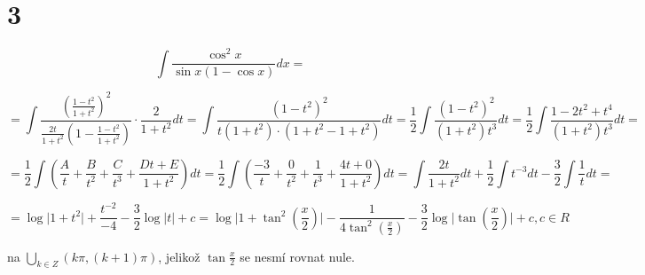 \documentclass[11pt,a4paper]{article}
\begin{document}
\section*{3}
$$
\int \frac{\cos^2 x}{\sin x (1 - \cos x)} dx = 
$$
\begin{flushright}
[substituce: $t = \tan \frac{x}{2}$, $dx = \frac{2}{1+t^2} dt$, $\sin x = \frac{2t}{1+t^2}$, $\cos x = \frac{1-t^2}{1+t^2}$]
\end{flushright}
$$
= \int \frac{ (\frac{1-t^2}{1+t^2})^2 }{ \frac{2t}{1+t^2} (1-\frac{1-t^2}{1+t^2})}
\cdot \frac{2}{1+t^2} dt
= \int \frac{ (1-t^2)^2}{ t(1+t^2)\cdot(1+t^2-1+t^2) } dt 
= \frac{1}{2} \int \frac{ (1-t^2)^2}{ (1+t^2) t^3 } dt 
= \frac{1}{2} \int \frac{ 1-2t^2+t^4 }{ (1+t^2) t^3 } dt =
$$  

$$
=\frac{1}{2} \int( \frac{A}{t} + \frac{B}{t^2} + \frac{C}{t^3} + \frac{Dt+E}{1+t^2} ) dt 
=\frac{1}{2} \int( \frac{-3}{t} + \frac{0}{t^2} + \frac{1}{t^3} + \frac{4t+0}{1+t^2} ) dt
=\int \frac{2t}{1+t^2} dt + \frac{1}{2} \int t^{-3} dt - \frac{3}{2} \int \frac{1}{t} dt = 
$$
\begin{flushright}
[první integrál substitucí za $s = 1+t^2$, druhé dva přímo]
\end{flushright}
$$
= \log \vert1+t^2\vert + \frac{t^{-2}}{-4} - \frac{3}{2} \log \vert t \vert + c
= \log \vert 1+\tan^2(\frac{x}{2}) \vert - \frac{1}{4 \tan^2(\frac{x}{2})} - \frac{3}{2} \log \vert \tan(\frac{x}{2}) \vert + c, c \in R
$$
\begin{flushright}
na $\bigcup_{k \in Z} (k\pi, (k+1)\pi)$, jelikož $\tan \frac{x}{2}$ se nesmí rovnat nule.
\end{flushright}
\end{document}
